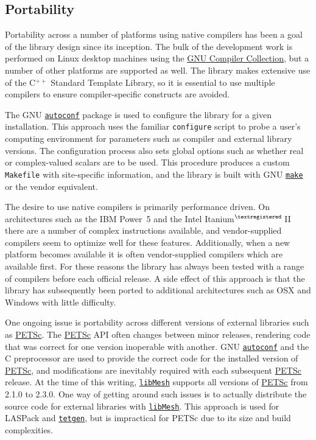 \documentclass[global,twocolumn,final]{svjour}
\newcommand{\libMesh}{\href{http://libmesh.sourceforge.net}{\texttt{lib\-Mesh}}}
\newcommand{\PETSc}{\href{http://www-unix.mcs.anl.gov/petsc/petsc-2}{PETSc}}
\newcommand{\tetgen}{\href{http://tetgen.berlios.de}{\texttt{tetgen}}}
\newcommand{\autoconf}{\href{http://www.gnu.org/software/autoconf}{\texttt{autoconf}}}
\newcommand{\make}{\href{http://www.gnu.org/software/make}{\texttt{make}}}
\newcommand{\cpp}{C{\tiny$^{++}$}}
\newcommand{\ICESOnly}[1]{}     %
\begin{document}
\subsection{Portability}
Portability across a number of platforms using native compilers has
been a goal of the library design since its inception.  The bulk of the
development work is performed on Linux desktop machines using the
\href{http://gcc.gnu.org}{GNU Compiler Collection}, but a number of
other platforms are supported as well.  The library makes extensive
use of the \cpp{} Standard Template Library, so it is essential to use
multiple compilers to ensure compiler-specific constructs are avoided.
\ICESOnly{
Because \libMesh{} is an open source application, compatibility with
even old and non-standards-compliant compilers is an important way to
make the library accessible to new developers.  Functionality which is
now part of the \cpp{} standard but which was not immediately
supported by popular compilers is still used in \libMesh{} via
compatibility classes like \texttt{AutoPtr} and
\texttt{OStringStream}, which reimplement the standard interfaces in
ways pre-standard compilers can understand.
}

The GNU \autoconf{} package is used to configure the library for
a given installation.  This approach uses the familiar
\texttt{configure} script to probe a user's computing environment for
parameters such as compiler and external library versions.
The configuration process also
sets global options such as whether real or
complex-valued scalars are to be used.  This procedure produces a
custom \texttt{Makefile} with site-specific
information, and the library is built with GNU \make{} or the
vendor equivalent.

The desire to use native compilers is primarily performance driven.
On architectures such as the IBM Power~5 and the Intel
Itanium\small$^{\textregistered}\!\!$\normalsize~II there are a number of
complex instructions available, and vendor-supplied compilers seem to
optimize well for these features.  Additionally, when a new platform
becomes available it is often vendor-supplied compilers which are
available first.  For these reasons the library has always been tested
with a range of compilers before each official release.  A side effect
of this approach is that the library has subsequently been ported to
additional architectures such as OSX and Windows with little
difficulty.

One ongoing issue is portability across different versions of external
libraries such as \PETSc.  The \PETSc{} API often changes between
minor releases, rendering code that was correct for one version
inoperable with another.  GNU \autoconf{} and the C preprocessor are
used to provide the correct code for the installed version of
\PETSc{}, and modifications are inevitably required with each
subsequent \PETSc{} release.  At the time of this writing, \libMesh{}
supports all versions of \PETSc{} from 2.1.0 to 2.3.0.
One way of getting around such issues is to actually distribute
the source code for external libraries with \libMesh.  This approach
is used for LASPack and \tetgen, but is impractical for PETSc due to
its size and build complexities.
\end{document}
